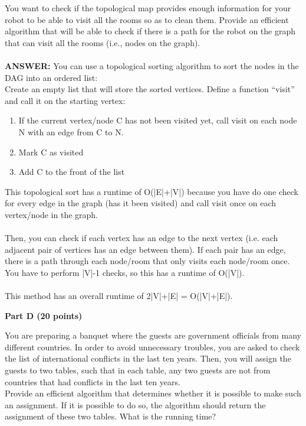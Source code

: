 \documentclass{article}
\begin{document}
 You want to check if the topological map provides
enough information for your robot to be able to visit all the rooms so
as to clean them. Provide an efficient algorithm that will be able to
check if there is a path for the robot on the graph that can visit all
the rooms (i.e., nodes on the graph).\\\\
{\bfseries ANSWER: }You can use a topological sorting algorithm to sort
the nodes in the DAG into an ordered list:\\
Create an empty list that will store the sorted vertices. Define a
function ``visit'' and call it on the starting vertex:
\begin{enumerate}
\item If the current vertex/node C has not been visited yet, call visit on each node N with an
edge from C to N.
\item Mark C as visited
\item Add C to the front of the list
\end{enumerate}
\noindent This topological sort has a runtime of O(|E|+|V|) because you
have do one check for every edge in the graph (has it been visited) and
call visit once on each vertex/node in the graph.\\\\
Then, you can check if each vertex has an edge to the next vertex (i.e. each adjacent
pair of vertices has an edge between them). If each pair has an edge,
there is a path through each node/room that only visits each node/room
once. You have to perform |V|-1 checks, so this has a runtime of O(|V|).\\\\
This method has an overall runtime of 2|V|+|E| = O(|V|+|E|).\

\begin{center}
{\bf Part D (20 points)}
\end{center}

 You are preparing a banquet where the
guests are government officials from many different countries. In
order to avoid unnecessary troubles, you are asked to check the list
of international conflicts in the last ten years. Then, you will
assign the guests to two tables, such that in each table, any two
guests are not from countries that had conflicts in the last ten
years.\\

\noindent Provide an efficient algorithm that determines whether it is
possible to make such an assignment. If it is possible to do so, the
algorithm should return the assignment of these two tables. What is
the running time?\\
\end{document}

